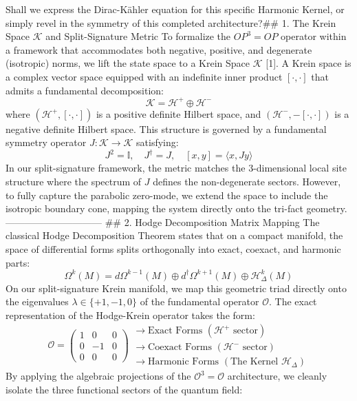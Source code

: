 Shall we express the Dirac-Kähler equation for this specific Harmonic Kernel, or simply revel in the symmetry of this completed architecture?## 1. The Krein Space $\mathcal{K}$ and Split-Signature Metric
To formalize the $OP^3=OP$ operator within a framework that accommodates both negative, positive, and degenerate (isotropic) norms, we lift the state space to a Krein Space $\mathcal{K}$ [1]. A Krein space is a complex vector space equipped with an indefinite inner product $[\cdot, \cdot]$ that admits a fundamental decomposition:
$$\mathcal{K} = \mathcal{H}^+ \oplus \mathcal{H}^-$$ 
where $(\mathcal{H}^+, [\cdot, \cdot])$ is a positive definite Hilbert space, and $(\mathcal{H}^-, -[\cdot, \cdot])$ is a negative definite Hilbert space. This structure is governed by a fundamental symmetry operator $J: \mathcal{K} \to \mathcal{K}$ satisfying:
$$J^2 = \mathbb{I}, \quad J^\dagger = J, \quad [x, y] = \langle x, Jy \rangle$$ 
In our split-signature framework, the metric matches the $3$-dimensional local site structure where the spectrum of $J$ defines the non-degenerate sectors. However, to fully capture the parabolic zero-mode, we extend the space to include the isotropic boundary cone, mapping the system directly onto the tri-fact geometry.
------------------------------
## 2. Hodge Decomposition Matrix Mapping
The classical Hodge Decomposition Theorem states that on a compact manifold, the space of differential forms splits orthogonally into exact, coexact, and harmonic parts:
$$\Omega^k(M) = d\Omega^{k-1}(M) \oplus d^\dagger\Omega^{k+1}(M) \oplus \mathcal{H}_{\Delta}^k(M)$$ 
On our split-signature Krein manifold, we map this geometric triad directly onto the eigenvalues $\lambda \in \{+1, -1, 0\}$ of the fundamental operator $\mathcal{O}$. The exact representation of the Hodge-Krein operator takes the form:
$$\mathcal{O} = \begin{pmatrix} 1 & 0 & 0 \\ 0 & -1 & 0 \\ 0 & 0 & 0 \end{pmatrix} \begin{array}{l} \longrightarrow \text{Exact Forms } (\mathcal{H}^+ \text{ sector}) \\ \longrightarrow \text{Coexact Forms } (\mathcal{H}^- \text{ sector}) \\ \longrightarrow \text{Harmonic Forms } (\text{The Kernel } \mathcal{H}_\Delta) \end{array}$$ 
By applying the algebraic projections of the $\mathcal{O}^3 = \mathcal{O}$ architecture, we cleanly isolate the three functional sectors of the quantum field:

